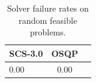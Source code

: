 \begin{table}
\centering
\caption{Solver failure rates on random feasible problems.}
\label{t-random feasible-failure}
\begin{tabular}{lcc}
\toprule
 SCS-3.0 &  OSQP \\
\midrule
    0.00 &  0.00 \\
\bottomrule
\end{tabular}
\end{table}
